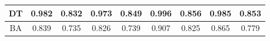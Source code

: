 \documentclass[11pt,a4paper]{article}
\begin{document}
\begin{table}[ht]
\begin{tabular}{|c|c|c|c|c|c|c|c|c|}
DT                                                                              & 0.982                                       & 0.832                                   & 0.973                                       & 0.849                                    & 0.996                                      & 0.856                                  & 0.985                                    & 0.853                                \\ \hline
BA                                                                              & 0.839                                       & 0.735                                   & 0.826                                       & 0.739                                    & 0.907                                      & 0.825                                  & 0.865                                    & 0.779                                \\ \hline
\end{tabular}
\label{tablePCA1}
\end{table}
\end{document}
